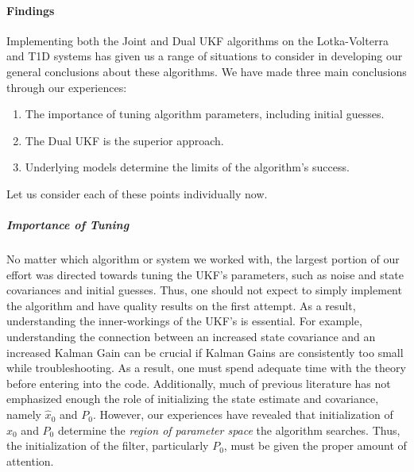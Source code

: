 \paragraph{Findings}
Implementing both the Joint and Dual UKF algorithms on the Lotka-Volterra and T1D systems has given us a range of situations to consider in developing our general conclusions about these algorithms. We have made three main conclusions through our experiences:
\begin{enumerate}
    \item The importance of tuning algorithm parameters, including initial guesses.
    \item The Dual UKF is the superior approach.
    \item Underlying models determine the limits of the algorithm's success.
\end{enumerate}
Let us consider each of these points individually now.

\subparagraph{Importance of Tuning}
No matter which algorithm or system we worked with, the largest portion of our effort was directed towards tuning the UKF's parameters, such as noise and state covariances and initial guesses. Thus, one should not expect to simply implement the algorithm and have quality results on the first attempt. As a result, understanding the inner-workings of the UKF's is essential. For example, understanding the connection between an increased state covariance and an increased Kalman Gain can be crucial if Kalman Gains are consistently too small while troubleshooting. As a result, one must spend adequate time with the theory before entering into the code. Additionally, much of previous literature has not emphasized enough the role of initializing the state estimate and covariance, namely $\hat{x}_0$ and $P_0$. However, our experiences have revealed that initialization of $\hat{x}_0$ and $P_0$ determine the \emph{region of parameter space} the algorithm searches. Thus, the initialization of the filter, particularly $P_0$, must be given the proper amount of attention.

